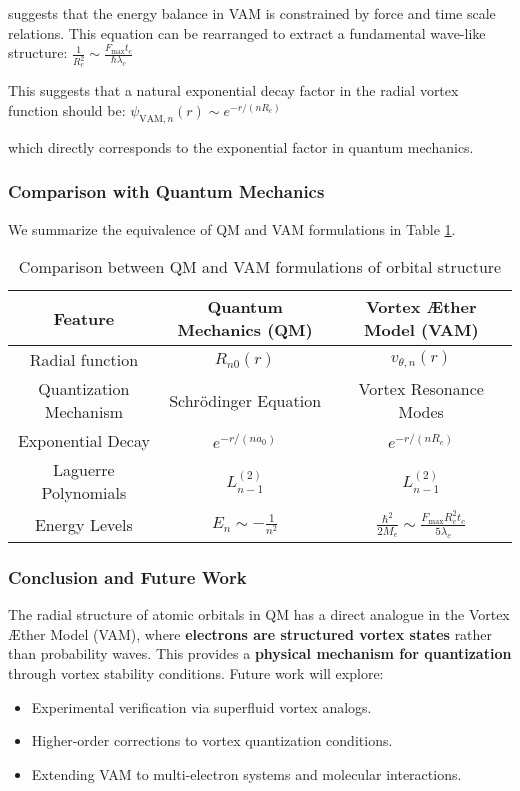 suggests that the energy balance in VAM is constrained by force and time scale relations. This equation can be rearranged to extract a fundamental wave-like structure:
$\frac{1}{R_c^2} \sim \frac{F_{\text{max}} t_c}{\hbar \lambda_c}$

This suggests that a natural exponential decay factor in the radial vortex function should be:
$\psi_{\text{VAM},n}(r) \sim e^{-r / (n R_c)}$


which directly corresponds to the exponential factor in quantum mechanics.

\subsubsection{Comparison with Quantum Mechanics}
We summarize the equivalence of QM and VAM formulations in Table \ref{tab:qm_vam}.

\begin{table}[h]
    \centering
    \renewcommand{\arraystretch}{1.3}
    \begin{tabular}{|c|c|c|}
        \hline
        \textbf{Feature} & \textbf{Quantum Mechanics (QM)} & \textbf{Vortex Æther Model (VAM)} \\
        \hline
        Radial function & \( R_{n0}(r) \) & \( v_{\theta, n}(r) \) \\
        \hline
        Quantization Mechanism & Schrödinger Equation & Vortex Resonance Modes \\
        \hline
        Exponential Decay & \( e^{-r / (n a_0)} \) & \( e^{-r / (n R_c)} \) \\
        \hline
        Laguerre Polynomials & \( L_{n-1}^{(2)} \) & \( L_{n-1}^{(2)} \) \\
        \hline
        Energy Levels & \( E_n \sim -\frac{1}{n^2} \) & \( \frac{\hbar^2}{2M_e} \sim \frac{F_{\text{max}} R_c^2 t_c}{5 \lambda_c} \) \\
        \hline
    \end{tabular}
    \caption{Comparison between QM and VAM formulations of orbital structure}
    \label{tab:qm_vam}
\end{table}

\subsubsection{Conclusion and Future Work}
The radial structure of atomic orbitals in QM has a direct analogue in the Vortex Æther Model (VAM), where \textbf{electrons are structured vortex states} rather than probability waves. This provides a \textbf{physical mechanism for quantization} through vortex stability conditions. Future work will explore:
\begin{itemize}
    \item Experimental verification via superfluid vortex analogs.
    \item Higher-order corrections to vortex quantization conditions.
    \item Extending VAM to multi-electron systems and molecular interactions.
\end{itemize}


